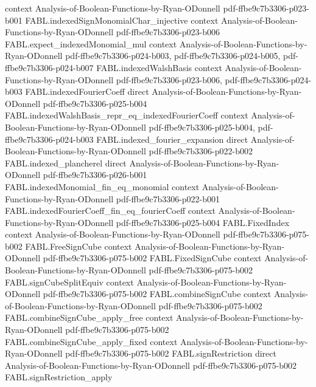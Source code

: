 \begin{theorem}
  {context}
  {Analysis-of-Boolean-Functions-by-Ryan-ODonnell}
  {pdf-ffbe9c7b3306-p023-b001}
\proofstep
  {FABL.indexedSignMonomialChar_injective}
  {context}
  {Analysis-of-Boolean-Functions-by-Ryan-ODonnell}
  {pdf-ffbe9c7b3306-p023-b006}
\proofstep
  {FABL.expect_indexedMonomial_mul}
  {context}
  {Analysis-of-Boolean-Functions-by-Ryan-ODonnell}
  {pdf-ffbe9c7b3306-p024-b003,
    pdf-ffbe9c7b3306-p024-b005,
    pdf-ffbe9c7b3306-p024-b007}
\proofstep
  {FABL.indexedWalshBasis}
  {context}
  {Analysis-of-Boolean-Functions-by-Ryan-ODonnell}
  {pdf-ffbe9c7b3306-p023-b006,
    pdf-ffbe9c7b3306-p024-b003}
\proofstep
  {FABL.indexedFourierCoeff}
  {direct}
  {Analysis-of-Boolean-Functions-by-Ryan-ODonnell}
  {pdf-ffbe9c7b3306-p025-b004}
\proofstep
  {FABL.indexedWalshBasis_repr_eq_indexedFourierCoeff}
  {context}
  {Analysis-of-Boolean-Functions-by-Ryan-ODonnell}
  {pdf-ffbe9c7b3306-p025-b004,
    pdf-ffbe9c7b3306-p024-b003}
\proofstep
  {FABL.indexed_fourier_expansion}
  {direct}
  {Analysis-of-Boolean-Functions-by-Ryan-ODonnell}
  {pdf-ffbe9c7b3306-p022-b002}
\proofstep
  {FABL.indexed_plancherel}
  {direct}
  {Analysis-of-Boolean-Functions-by-Ryan-ODonnell}
  {pdf-ffbe9c7b3306-p026-b001}
\proofstep
  {FABL.indexedMonomial_fin_eq_monomial}
  {context}
  {Analysis-of-Boolean-Functions-by-Ryan-ODonnell}
  {pdf-ffbe9c7b3306-p022-b001}
\proofstep
  {FABL.indexedFourierCoeff_fin_eq_fourierCoeff}
  {context}
  {Analysis-of-Boolean-Functions-by-Ryan-ODonnell}
  {pdf-ffbe9c7b3306-p025-b004}
\proofstep
  {FABL.FixedIndex}
  {context}
  {Analysis-of-Boolean-Functions-by-Ryan-ODonnell}
  {pdf-ffbe9c7b3306-p075-b002}
\proofstep
  {FABL.FreeSignCube}
  {context}
  {Analysis-of-Boolean-Functions-by-Ryan-ODonnell}
  {pdf-ffbe9c7b3306-p075-b002}
\proofstep
  {FABL.FixedSignCube}
  {context}
  {Analysis-of-Boolean-Functions-by-Ryan-ODonnell}
  {pdf-ffbe9c7b3306-p075-b002}
\proofstep
  {FABL.signCubeSplitEquiv}
  {context}
  {Analysis-of-Boolean-Functions-by-Ryan-ODonnell}
  {pdf-ffbe9c7b3306-p075-b002}
\proofstep
  {FABL.combineSignCube}
  {context}
  {Analysis-of-Boolean-Functions-by-Ryan-ODonnell}
  {pdf-ffbe9c7b3306-p075-b002}
\proofstep
  {FABL.combineSignCube_apply_free}
  {context}
  {Analysis-of-Boolean-Functions-by-Ryan-ODonnell}
  {pdf-ffbe9c7b3306-p075-b002}
\proofstep
  {FABL.combineSignCube_apply_fixed}
  {context}
  {Analysis-of-Boolean-Functions-by-Ryan-ODonnell}
  {pdf-ffbe9c7b3306-p075-b002}
\proofstep
  {FABL.signRestriction}
  {direct}
  {Analysis-of-Boolean-Functions-by-Ryan-ODonnell}
  {pdf-ffbe9c7b3306-p075-b002}
\proofstep
  {FABL.signRestriction_apply}

\end{theorem}
